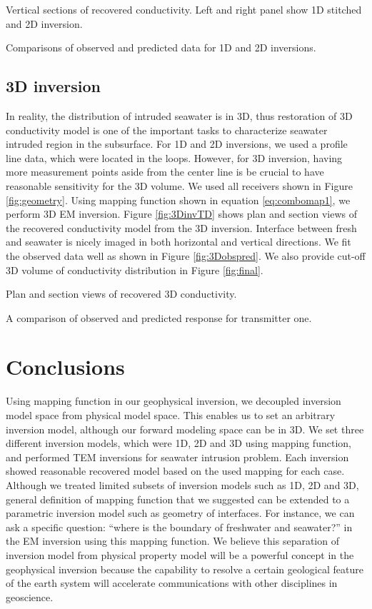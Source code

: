 \documentclass{segabs}
\begin{document}
{Vertical sections of recovered conductivity. Left and right panel show 1D stitched and 2D inversion.}

{Comparisons of observed and predicted data for 1D and 2D inversions. }

\subsection*{3D inversion}
In reality, the distribution of intruded seawater is in 3D, thus restoration of 3D conductivity model is one of the important tasks to characterize seawater intruded region in the subsurface. For 1D and 2D inversions, we used a profile line data, which were located in the loops. However, for 3D inversion, having more measurement points aside from the center line is be crucial to have reasonable sensitivity for the 3D volume. We used all receivers shown in Figure \ref{fig:geometry}. Using mapping function shown in equation \ref{eq:combomap1}, we perform 3D EM inversion. Figure \ref{fig:3DinvTD} shows plan and section views of the recovered conductivity model from the 3D inversion. Interface between fresh and seawater is nicely imaged in both horizontal and vertical directions. We fit the observed data well as shown in Figure \ref{fig:3Dobspred}. We also provide cut-off 3D volume of conductivity distribution in Figure \ref{fig:final}.

{Plan and section views of recovered 3D conductivity.}

{A comparison of observed and predicted response for transmitter one.}

\section*{Conclusions}
Using mapping function in our geophysical inversion, we decoupled inversion model space from physical model space. This enables us to set an arbitrary inversion model, although our forward modeling space can be in 3D. We set three different inversion models, which were 1D, 2D and 3D using mapping function, and performed TEM inversions for seawater intrusion problem. Each inversion showed reasonable recovered model based on the used mapping for each case. Although we treated limited subsets of inversion models such as 1D, 2D and 3D, general definition of mapping function that we suggested can be extended to a parametric inversion model such as geometry of interfaces. For instance, we can ask a specific question: ``where is the boundary of freshwater and seawater?'' in the EM inversion using this mapping function. We believe this separation of inversion model from physical property model will be a powerful concept in the geophysical inversion because the capability to resolve a certain geological feature of the earth system  will accelerate communications with other disciplines in geoscience.
\end{document}

